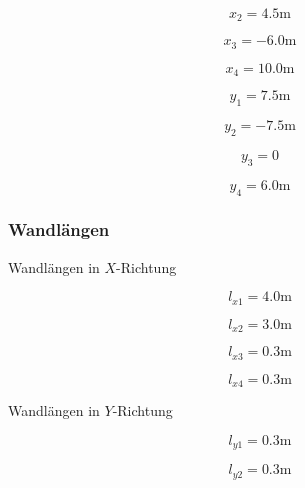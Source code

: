 \documentclass[
  letterpaper,
  DIV=11]{scrreprt}
\begin{document}
\begin{equation*}x_{2} = 4.5 \text{m}\end{equation*}

\begin{equation*}x_{3} = - 6.0 \text{m}\end{equation*}

\begin{equation*}x_{4} = 10.0 \text{m}\end{equation*}

\begin{equation*}y_{1} = 7.5 \text{m}\end{equation*}

\begin{equation*}y_{2} = - 7.5 \text{m}\end{equation*}

\begin{equation*}y_{3} = 0\end{equation*}

\begin{equation*}y_{4} = 6.0 \text{m}\end{equation*}

\hypertarget{wandluxe4ngen}{%
\subsubsection{Wandlängen}\label{wandluxe4ngen}}

Wandlängen in \(X\)-Richtung

\begin{equation*}l_{x1} = 4.0 \text{m}\end{equation*}

\begin{equation*}l_{x2} = 3.0 \text{m}\end{equation*}

\begin{equation*}l_{x3} = 0.3 \text{m}\end{equation*}

\begin{equation*}l_{x4} = 0.3 \text{m}\end{equation*}

Wandlängen in \(Y\)-Richtung

\begin{equation*}l_{y1} = 0.3 \text{m}\end{equation*}

\begin{equation*}l_{y2} = 0.3 \text{m}\end{equation*}
\end{document}
